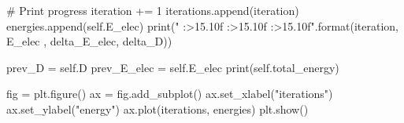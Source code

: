 \documentclass{beamer}
\begin{document}
    \begin{frame}[fragile]
        \begin{python}
            # Print progress
            iteration += 1
            iterations.append(iteration)
            energies.append(self.E_elec)
            print("{} {:>15.10f} {:>15.10f} {:>15.10f}".format(iteration, E_elec , delta_E_elec, delta_D))
        
            prev_D = self.D
            prev_E_elec = self.E_elec
        print(self.total_energy)
    \end{python}
\end{frame}
\begin{frame}[fragile]
    \begin{python}        
        fig = plt.figure()
        ax = fig.add_subplot()
        ax.set_xlabel("iterations")
        ax.set_ylabel("energy")
        ax.plot(iterations, energies)
        plt.show()

    \end{python}
\end{frame}
\end{document}
